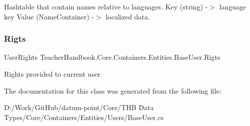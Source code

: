 Hashtable that contain names relative to languages. Key (string) -\/$>$ language key Value (Name\+Container) -\/$>$ localized data. 

\mbox{\label{class_teacher_handbook_1_1_core_1_1_containers_1_1_entities_1_1_base_user_a0aeebd3854d7996435cdb2fc691c2bc3}} 
\subsubsection{\texorpdfstring{Rigts}{Rigts}}
{\footnotesize\ttfamily User\+Rights Teacher\+Handbook.\+Core.\+Containers.\+Entities.\+Base\+User.\+Rigts\hspace{0.3cm}{\ttfamily [get]}}



Rights provided to current user 



The documentation for this class was generated from the following file\+:\begin{DoxyCompactItemize}
\item 
D\+:/\+Work/\+Git\+Hub/datum-\/point/\+Core/\+T\+H\+B Data Types/\+Core/\+Containers/\+Entities/\+Users/Base\+User.\+cs\end{DoxyCompactItemize}
